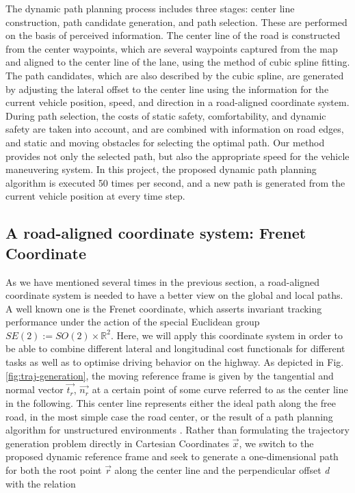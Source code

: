 The dynamic path planning process includes three stages: center line construction, path candidate generation, and path selection. These are performed on the basis of perceived information. The center line of the road is constructed from the center waypoints, which are several waypoints captured from the map and aligned to the center line of the lane, using the method of cubic spline fitting. The path candidates, which are also described by the cubic spline, are generated by adjusting the lateral offset to the center line using the information for the current vehicle position, speed, and direction in a road-aligned coordinate system. During path selection, the costs of static safety, comfortability, and dynamic safety are taken into account, and are combined with information on road edges, and static and moving obstacles for selecting the optimal path. Our method provides not only the selected path, but also the appropriate speed for the vehicle maneuvering system. In this project, the proposed dynamic path planning algorithm is executed 50 times per second, and a new path is generated from the current vehicle position at every time step. 

\subsection{A road-aligned coordinate system: Frenet Coordinate}

As we have mentioned several times in the previous section, a road-aligned coordinate system is needed to have a better view on the global and local paths. A well known one is the Frenet coordinate, which asserts invariant tracking performance under the action of the special Euclidean group $SE(2) := SO(2) \times \mathbb{R}^2$. Here, we will apply this coordinate system in order to be able to combine different lateral and longitudinal cost functionals for different tasks as well as to optimise driving behavior on the highway. As depicted in Fig. \ref{fig:traj-generation}, the moving reference frame is given by the tangential and normal vector $\overrightarrow{t_r}$, $\overrightarrow{n_r}$ at a certain point of some curve referred to as the center line in the following. This center line represents either the ideal path along the free road, in the most simple case the road center, or the result of a path planning algorithm for unstructured environments \cite{Frenet2008}. Rather than formulating the trajectory generation problem directly in Cartesian Coordinates $\overrightarrow{x}$, we switch to the proposed dynamic reference frame and seek to generate a one-dimensional path for both the root point $\overrightarrow{r}$ along the center line and the perpendicular offset \textit{d} with the relation

